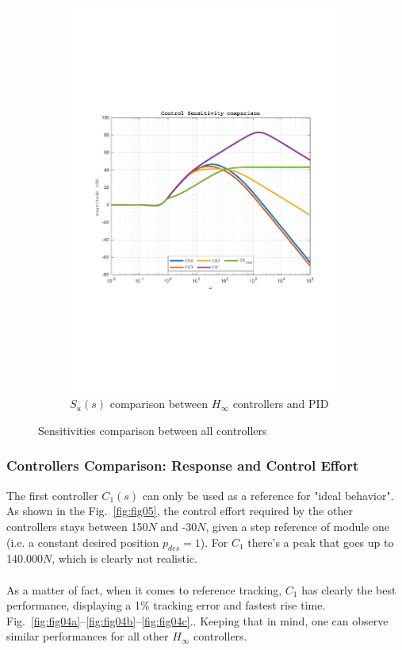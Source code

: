 \documentclass[a4paper, 12pt]{article}
\begin{document}
\begin{figure}[h!]
\begin{subfigure}[t]{0.32\textwidth}
           \includegraphics[width=\textwidth]
           {Figures/fig03c.pdf}
           \captionsetup{margin=2mm}
           \caption{$S_u(s)$ comparison between $H_\infty$ controllers and PID}
           \label{fig:fig03c}
       \end{subfigure}
       \caption{Sensitivities comparison between all controllers}
           \label{fig:fig03}
\end{figure}
\clearpage
\subsubsection{Controllers Comparison: Response and Control Effort}
The first controller $C_1(s)$ can only be used as a reference for "ideal behavior". As shown in the Fig.~\ref{fig:fig05}, the control effort required by the other controllers stays between 150$N$ and -30$N$, given a step reference of module one (i.e. a constant desired position $p_{des} = 1$). For $C_1$ there's a peak that goes up to 140.000$N$, which is clearly not realistic.
\\
\\
As a matter of fact, when it comes to reference tracking, $C_1$ has clearly the best performance, displaying a 1\% tracking error and fastest rise time. Fig.~\ref{fig:fig04a}--\ref{fig:fig04b}--\ref{fig:fig04c}.. Keeping that in mind, one can observe similar performances for all other $H_\infty$ controllers.
\end{document}
